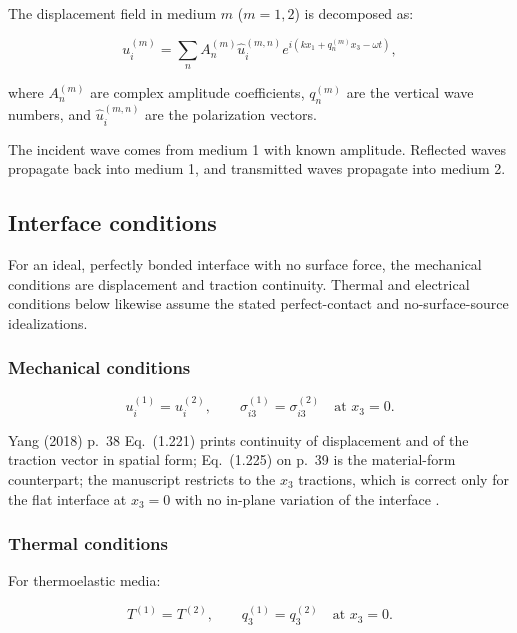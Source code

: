 The displacement field in medium $m$ ($m = 1, 2$) is decomposed as:

\begin{equation}
u_i^{(m)} = \sum_n A_n^{(m)} \hat{u}_i^{(m,n)} e^{i(kx_1+q_n^{(m)}x_3-\omega t)},
\label{eq:9.2}
\end{equation}

where $A_n^{(m)}$ are complex amplitude coefficients, $q_n^{(m)}$ are the vertical wave numbers, and $\hat{u}_i^{(m,n)}$ are the polarization vectors.

The incident wave comes from medium 1 with known amplitude. Reflected waves propagate back into medium 1, and transmitted waves propagate into medium 2.

\subsection{Interface conditions}
\label{sec:9.3}

For an ideal, perfectly bonded interface with no surface force, the mechanical conditions are displacement and traction continuity. Thermal and electrical conditions below likewise assume the stated perfect-contact and no-surface-source idealizations.

\subsubsection{Mechanical conditions}

\begin{equation}
u_i^{(1)} = u_i^{(2)}, \qquad \sigma_{i3}^{(1)} = \sigma_{i3}^{(2)} \quad \text{at } x_3 = 0.
\label{eq:9.3}
\end{equation}

Yang (2018) p.~38 Eq.~(1.221) prints continuity of displacement and of the traction vector in spatial form; Eq.~(1.225) on p.~39 is the material-form counterpart; the manuscript restricts to the $x_3$ tractions, which is correct only for the flat interface at $x_3=0$ with no in-plane variation of the interface \cite{Yang2018}.

\subsubsection{Thermal conditions}

For thermoelastic media:

\begin{equation}
T^{(1)} = T^{(2)}, \qquad q_3^{(1)} = q_3^{(2)} \quad \text{at } x_3 = 0.
\label{eq:9.4}
\end{equation}

